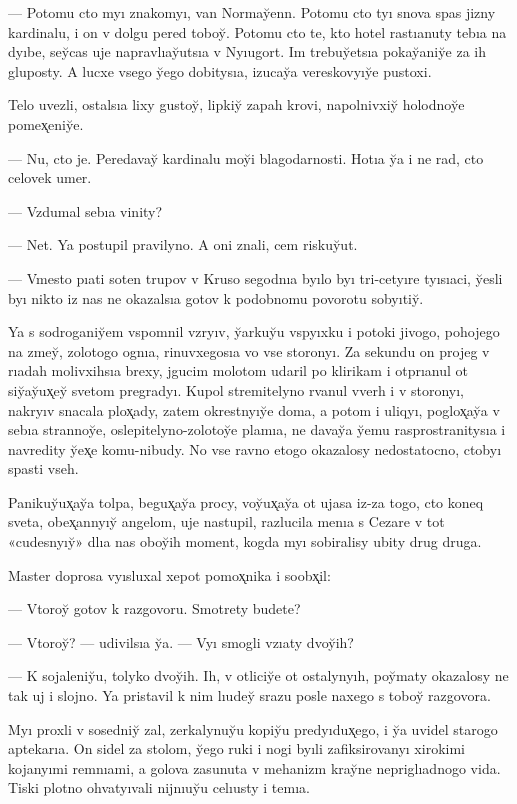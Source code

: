 \documentclass[10pt]{book}
\begin{document}
— Potomu cto myı znakomyı, van Normay̆enn. Potomu cto tyı snova spas jizny kardinalu, i on v dolgu pered toboy̆. Potomu cto te, kto hotel rastıanuty tebıa na dyıbe, sey̆cas uje napravlıay̆utsıa v Nyıugort. Im trebuy̆etsıa pokay̆aniy̆e za ih gluposty. A lucxe vsego y̆ego dobitysıa, izucay̆a vereskovyıy̆e pustoxi.

Telo uvezli, ostalsıa lixy gustoy̆, lipkiy̆ zapah krovi, napolnivxiy̆ holodnoy̆e pomex̨eniy̆e.

— Nu, cto je. Peredavay̆ kardinalu moy̆i blagodarnosti. Hotıa y̆a i ne rad, cto celovek umer.

— Vzdumal sebıa vinity?

— Net. Ya postupil pravilyno. A oni znali, cem riskuy̆ut.

— Vmesto pıati soten trupov v Kruso segodnıa byılo byı tri-cetyıre tyısıaci, y̆esli byı nikto iz nas ne okazalsıa gotov k podobnomu povorotu sobyıtiy̆.

Ya s sodroganiy̆em vspomnil vzryıv, y̆arkuy̆u vspyıxku i potoki jivogo, pohojego na zmey̆, zolotogo ognıa, rinuvxegosıa vo vse storonyı. Za sekundu on projeg v rıadah molivxihsıa brexy, jgucim molotom udaril po klirikam i otprıanul ot siy̆ay̆ux̨ey̆ svetom pregradyı. Kupol stremitelyno rvanul vverh i v storonyı, nakryıv snacala plox̨ady, zatem okrestnyıy̆e doma, a potom i uliqyı, poglox̨ay̆a v sebıa strannoy̆e, oslepitelyno-zolotoy̆e plamıa, ne davay̆a y̆emu rasprostranitysıa i navredity y̆ex̨e komu-nibudy. No vse ravno etogo okazalosy nedostatocno, ctobyı spasti vseh.

Panikuy̆ux̨ay̆a tolpa, begux̨ay̆a procy, voy̆ux̨ay̆a ot ujasa iz-za togo, cto koneq sveta, obex̨annyıy̆ angelom, uje nastupil, razlucila menıa s Cezare v tot «cudesnyıy̆» dlıa nas oboy̆ih moment, kogda myı sobiralisy ubity drug druga.

Master doprosa vyısluxal xepot pomox̨nika i soobx̨il:

— Vtoroy̆ gotov k razgovoru. Smotrety budete?

— Vtoroy̆? — udivilsıa y̆a. — Vyı smogli vzıaty dvoy̆ih?

— K sojaleniy̆u, tolyko dvoy̆ih. Ih, v otliciy̆e ot ostalynyıh, poy̆maty okazalosy ne tak uj i slojno. Ya pristavil k nim lıudey̆ srazu posle naxego s toboy̆ razgovora.

Myı proxli v sosedniy̆ zal, zerkalynuy̆u kopiy̆u predyıdux̨ego, i y̆a uvidel starogo aptekarıa. On sidel za stolom, y̆ego ruki i nogi byıli zafiksirovanyı xirokimi kojanyımi remnıami, a golova zasunuta v mehanizm kray̆ne nepriglıadnogo vida. Tiski plotno ohvatyıvali nijnıuy̆u celıusty i temıa.
\end{document}
